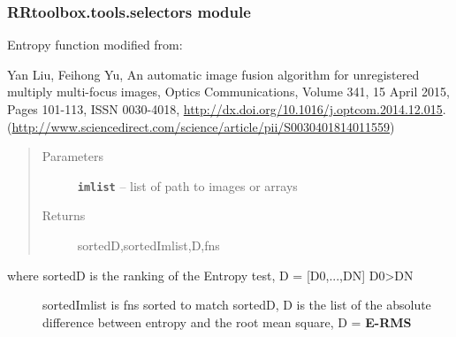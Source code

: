 \documentclass[letterpaper,10pt,english]{sphinxmanual}
\begin{document}
\begin{fulllineitems}
\label{RRtoolbox.tools:RRtoolbox.tools.segmentation.retinal_mask_simple}
\end{fulllineitems}



\subsubsection{RRtoolbox.tools.selectors module}
\label{RRtoolbox.tools:module-RRtoolbox.tools.selectors}\label{RRtoolbox.tools:rrtoolbox-tools-selectors-module}

\begin{fulllineitems}
\label{RRtoolbox.tools:RRtoolbox.tools.selectors.entropy}
Entropy function modified from:

Yan Liu, Feihong Yu, An automatic image fusion algorithm for unregistered multiply multi-focus images,
Optics Communications, Volume 341, 15 April 2015, Pages 101-113, ISSN 0030-4018,
\href{http://dx.doi.org/10.1016/j.optcom.2014.12.015}{http://dx.doi.org/10.1016/j.optcom.2014.12.015}.
(\href{http://www.sciencedirect.com/science/article/pii/S0030401814011559}{http://www.sciencedirect.com/science/article/pii/S0030401814011559})
\begin{quote}\begin{description}
\item[{Parameters}] \leavevmode
\textbf{\texttt{imlist}} -- list of path to images or arrays

\item[{Returns}] \leavevmode
sortedD,sortedImlist,D,fns

\end{description}\end{quote}
\begin{description}
\item[{where sortedD is the ranking of the Entropy test, D = {[}D0,...,DN{]} D0\textgreater{}DN}] \leavevmode
sortedImlist is fns sorted to match sortedD,
D is the list of the absolute difference between entropy and the root mean square, D = {\color{red}\bfseries{}\textbar{}E-RMS\textbar{}}

\end{description}

\end{fulllineitems}
\end{document}
